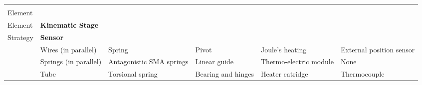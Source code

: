 \documentclass[border=1mm,
               class=article
               preview]{standalone}
\begin{document}
\renewcommand{\arraystretch}{1.5}
 {\footnotesize{}
\begin{tabular}{p{}
                p{}
                p{}
                p{}
                p{}
                p{}}
   \rowcolor{black}  & \textbf{\color{white} \parbox[t]{1.5cm}{Active\\Element}} & \textbf{\color{white} \parbox[t]{1.5cm}{Biasing\\Element}} & \textbf{\color{white} Kinematic Stage} & \textbf{\color{white} \parbox[t]{1.5cm}{Heating\\Strategy}} & \textbf{\color{white} Sensor}\\
   \cite{williamsControlAutomotiveShape2010a} & Wires (in parallel) & Spring & Pivot & Joule's heating & External position sensor\\
   \cite{belliniMechatronicDesignShape2009} & Springs (in parallel) & Antagonistic SMA springs & Linear guide & Thermo-electric module & None\\
   \cite{benafanRecentAdvancementsRotary2019a} & Tube & Torsional spring & Bearing and hinges & Heater catridge & Thermocouple\\
\end{tabular}}
\renewcommand{\arraystretch}{1}
\end{document}
